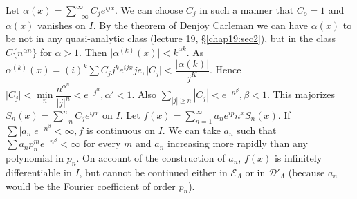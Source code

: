 Let $\alpha (x) = \sum\limits_{- \infty}^{\infty} C_j e^{i jx}$. We
can choose $C_j$ in such a manner that $C_o = 1$ and $\alpha (x)$
vanishes on $I$. By the theorem of Denjoy Carleman we can have $\alpha
(x)$ to be not in any quasi-analytic class (lecture 19, \S \ref{chap19:sec2}), but
in the class $C \big \{ n^{\alpha n} \big\}$ for $\alpha > 1$. Then
$\big | \alpha^{(k)} (x) \big | < k^{\alpha k}$. As $\alpha^{(k)} (x)
= (i)^k \sum C_jj^k e^{i j x} je, \big | C_j \big | < \dfrac{| \alpha (k)
 |}{j^K}$. Hence $\big | C_j \big | < \min\limits_{n}
\dfrac{n^{\alpha^n}}{|j|^n} < e^{- j^\alpha}, \alpha' < 1$. Also
$\sum\limits_{| j | \ge n} | C_j | < e^{-n^\beta}, \beta < 1$. This
majorizes $S_n (x) = \sum\limits_{-n}^n C_j e^{i j x}$ on $I$. Let
$f(x) = \sum\limits_{n = 1}^\infty a_n e^{i p} n^x S_n (x)$. If
$\sum | a_n | e^{-n^\beta} < \infty, f$ is continuous on $I$. We can
take $a_n$ such that $\sum a_n p^m_n e^{-n^\beta} < \infty$ for every
$m$ and $a_n$ increasing more rapidly than any polynomial in $p_n$. On
account of the construction of $a_n$, $f (x)$ is infinitely
differentiable in $I$, but cannot be continued either in
$\mathscr{E}_\Lambda$ or in $\mathscr{D}'_\Lambda$ (because $a_n$
would be the Fourier coefficient of order $p_n$). 
